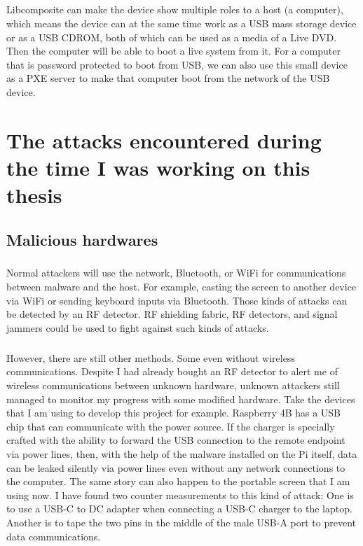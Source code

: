 \documentclass[mscthesis]{usiinfthesis}
\begin{document}
\paragraph{}
Libcomposite can make the device show multiple roles to a host (a computer), which means the device can at the same time work as a USB mass storage device or as a USB CDROM, both of which can be used as a media of a Live DVD. Then the computer will be able to boot a live system from it. For a computer that is password protected to boot from USB, we can also use this small device as a PXE server to make that computer boot from the network of the USB device.

\chapter{The attacks encountered during the time I was working on this thesis}

\section{Malicious hardwares}
\paragraph{}
Normal attackers will use the network, Bluetooth, or WiFi for communications between malware and the host. For example, casting the screen to another device via WiFi or sending keyboard inputs via Bluetooth. Those kinds of attacks can be detected by an RF detector. RF shielding fabric, RF detectors, and signal jammers could be used to fight against such kinds of attacks.
\paragraph{}
However, there are still other methods. Some even without wireless communications. Despite I had already bought an RF detector to alert me of wireless communications between unknown hardware, unknown attackers still managed to monitor my progress with some modified hardware. Take the devices that I am using to develop this project for example. Raspberry 4B has a USB chip that can communicate with the power source. If the charger is specially crafted with the ability to forward the USB connection to the remote endpoint via power lines, then, with the help of the malware installed on the Pi itself, data can be leaked silently via power lines even without any network connections to the computer. The same story can also happen to the portable screen that I am using now. I have found two counter measurements to this kind of attack: One is to use a USB-C to DC adapter when connecting a USB-C charger to the laptop. Another is to tape the two pins in the middle of the male USB-A port to prevent data communications.
\end{document}
